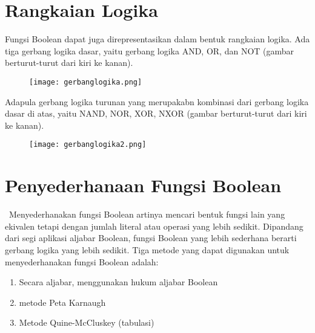 \documentclass[11pt]{article}
\theoremstyle{definitionstyle}
\theoremstyle{theoremstyle}
\theoremstyle{examplestyle}
\begin{document}
\section{Rangkaian Logika}
Fungsi Boolean dapat juga direpresentasikan dalam bentuk rangkaian logika. Ada tiga gerbang logika dasar, yaitu gerbang logika AND, OR, dan NOT (gambar berturut-turut dari kiri ke kanan). \\
\begin{figure}[h]
    \centering
    \texttt{[image: gerbanglogika.png]}
\end{figure}

Adapula gerbang logika turunan yang merupakabn kombinasi dari gerbang logika dasar di atas, yaitu NAND, NOR, XOR, NXOR (gambar berturut-turut dari kiri ke kanan). \\
\begin{figure}[h]
    \centering
    \texttt{[image: gerbanglogika2.png]} \\
\end{figure}

\section{Penyederhanaan Fungsi Boolean}\
Menyederhanakan fungsi Boolean artinya mencari bentuk fungsi lain yang ekivalen tetapi dengan jumlah literal atau operasi yang lebih sedikit. Dipandang dari segi aplikasi aljabar Boolean, fungsi Boolean yang lebih sederhana berarti gerbang logika yang lebih sedikit.
Tiga metode yang dapat digunakan untuk menyederhanakan fungsi Boolean adalah:
\begin{enumerate}
    \item Secara aljabar, menggunakan hukum aljabar Boolean
    \item metode Peta Karnaugh
    \item Metode Quine-McCluskey (tabulasi)
\end{enumerate}
\end{document}
